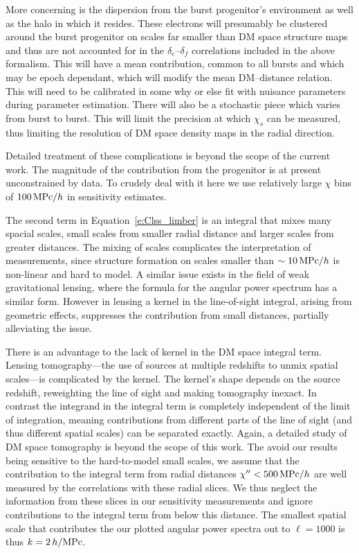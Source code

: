 \documentclass[twocolumn,prl,nofootinbib]{revtex4-1}
\begin{document}
More concerning is the dispersion from the burst progenitor's environment
as well as the halo in which it resides. These electrons will presumably be
clustered around the burst progenitor on scales far smaller than DM space
structure maps and thus are not accounted for in the $\delta_e$--$\delta_f$
correlations included in the above formalism.  This will have a mean
contribution, common to all bursts and which may be epoch dependant, which will
modify the mean DM--distance relation. This will need to be calibrated in some
why or else fit with nuisance parameters during parameter estimation.  There
will also be a stochastic piece which varies from burst to burst.  This will
limit the precision at which $\chi_s$ can be measured, thus limiting the
resolution of DM space density maps in the radial direction.

Detailed treatment of these complications is beyond the scope of the current
work. The magnitude of the contribution from the progenitor is at present
unconstrained by data. To crudely deal with it here we use relatively large 
$\chi$ bins of $100\,{\rm MPc}/h$ in sensitivity estimates.

The second term in Equation~\ref{e:Clss_limber} is an integral that mixes
many spacial scales, small scales from smaller radial distance and larger
scales from greater distances. The mixing of scales complicates the
interpretation of measurements, since structure formation on scales smaller
than $\sim10\,{\rm MPc}/h$ is non-linear and hard to model. A similar issue
exists in the field of weak gravitational lensing, where the formula for the
angular power spectrum has a similar form.  However in lensing a kernel in
the line-of-sight integral, arising from geometric effects, suppresses the
contribution from small distances, partially alleviating the issue.

There is an advantage to the lack of kernel in the DM space integral term.
Lensing tomography---the use of sources at multiple redshifts to unmix
spatial scales---is complicated by the kernel. The kernel's shape depends on
the source redshift, reweighting the line of sight and
making tomography inexact.  In contrast the integrand in the integral
term is completely independent of the limit of integration, meaning
contributions from different parts of the line of sight (and thus different
spatial scales) can be separated exactly. Again, a detailed study of DM space
tomography is beyond the scope of this work.  The avoid our results being
sensitive to the hard-to-model small scales, we assume that the contribution to the
integral term from radial distances $\chi'' < 500\,{\rm MPc}/h$ are well
measured by the correlations with these radial slices. We thus neglect the
information from these slices in our sensitivity measurements and ignore
contributions to the integral term from below this distance. The smallest
spatial scale that contributes the our plotted angular power spectra out to
$\ell=1000$ is thus $k=2\,h/{\rm MPc}$.
\end{document}
